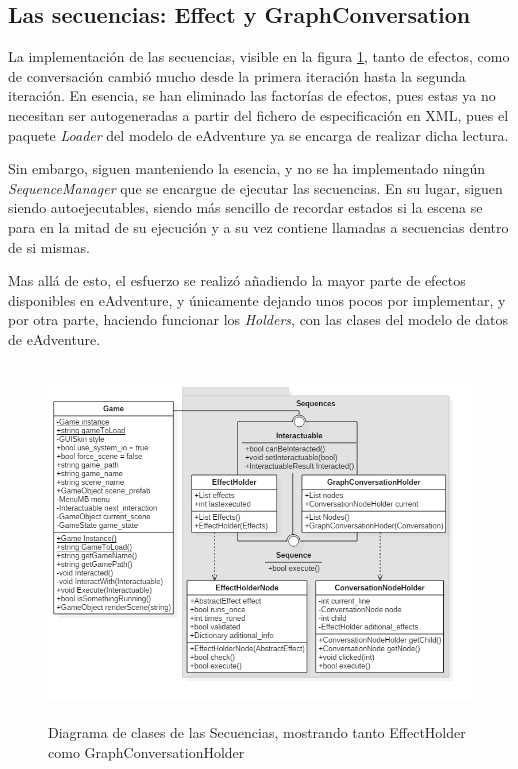 \subsection{Las secuencias: Effect y GraphConversation}
\label{sequencesit2}

La implementación de las secuencias, visible en la figura \ref{sequencesfigit2}, tanto de efectos, como de conversación cambió mucho desde la primera iteración hasta la segunda iteración. En esencia, se han eliminado las factorías de efectos, pues estas ya no necesitan ser autogeneradas a partir del fichero de especificación en XML, pues el paquete \textit{Loader} del modelo de eAdventure ya se encarga de realizar dicha lectura.

Sin embargo, siguen manteniendo la esencia, y no se ha implementado ningún \textit{SequenceManager} que se encargue de ejecutar las secuencias. En su lugar, siguen siendo autoejecutables, siendo más sencillo de recordar estados si la escena se para en la mitad de su ejecución y a su vez contiene llamadas a secuencias dentro de si mismas.

Mas allá de esto, el esfuerzo se realizó añadiendo la mayor parte de efectos disponibles en eAdventure, y únicamente dejando unos pocos por implementar, y por otra parte, haciendo funcionar los \textit{Holders}, con las clases del modelo de datos de eAdventure.

\begin{figure}[h!]
	\centerline{\includegraphics[height=3.7in]{figures/it2/Sequences.png}}
	\caption[Sequences - Versión Final]{Diagrama de clases de las Secuencias, mostrando tanto EffectHolder como GraphConversationHolder}
	\label{sequencesfigit2}
\end{figure}

